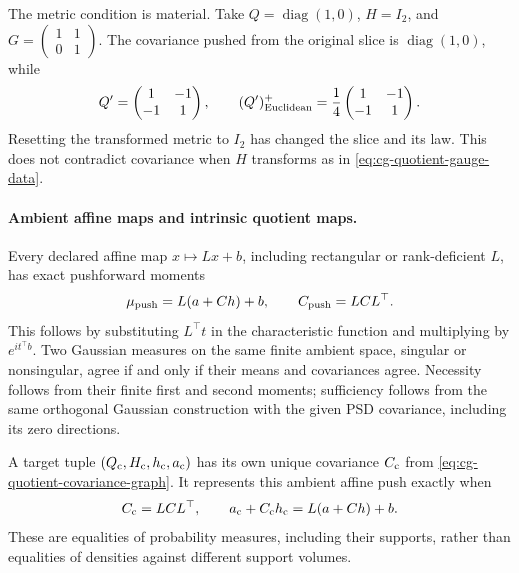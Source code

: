 The metric condition is material. Take
\(Q=\operatorname{diag}(1,0)\), \(H=I_2\), and
\(G=\begin{pmatrix}1&1\\0&1\end{pmatrix}\).
The covariance pushed from the original slice is
\(\operatorname{diag}(1,0)\), while
\begin{equation}
Q'=\begin{pmatrix}1&-1\\-1&1\end{pmatrix},
\qquad
(Q')^+_{\rm Euclidean}
=\frac14\begin{pmatrix}1&-1\\-1&1\end{pmatrix}.
\label{eq:cg-quotient-reference-counterexample}
\end{equation}
Resetting the transformed metric to \(I_2\) has changed
the slice and its law. This does not contradict covariance
when \(H\) transforms as in
\eqref{eq:cg-quotient-gauge-data}.

\paragraph{Ambient affine maps and intrinsic quotient maps.}
Every declared affine map \(x\mapsto Lx+b\), including
rectangular or rank-deficient \(L\), has exact pushforward
moments
\begin{equation}
\mu_{\rm push}=L(a+Ch)+b,\qquad
C_{\rm push}=LCL^\top.
\label{eq:cg-quotient-affine-push}
\end{equation}
This follows by substituting \(L^\top t\) in the
characteristic function and multiplying by
\(e^{it^\top b}\). Two Gaussian measures on the same
finite ambient space, singular or nonsingular, agree
if and only if their means and covariances agree.
Necessity follows from their finite first and second
moments; sufficiency follows from the same orthogonal
Gaussian construction with the given PSD covariance,
including its zero directions.

A target tuple
\((Q_{\rm c},H_{\rm c},h_{\rm c},a_{\rm c})\) has its
own unique covariance \(C_{\rm c}\) from
\eqref{eq:cg-quotient-covariance-graph}. It represents
this ambient affine push exactly when
\begin{equation}
C_{\rm c}=LCL^\top,\qquad
a_{\rm c}+C_{\rm c}h_{\rm c}=L(a+Ch)+b.
\label{eq:cg-quotient-ambient-law-equality}
\end{equation}
These are equalities of probability measures, including
their supports, rather than equalities of densities
against different support volumes.

